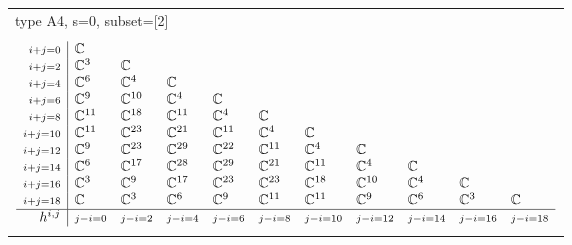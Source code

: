 \documentclass[crop,border=2mm]{standalone}
\begin{document}
\begin{tabular}{l}
{\huge type A4, s=0, subset=[2]}\\ \\


$\displaystyle
\begin{array}{r|l l l l l l l l l l}
	{\scriptstyle i+j=0}&\mathbb{C}&&&&&&&&&\\
	{\scriptstyle i+j=2}&\mathbb{C}^{3}&\mathbb{C}&&&&&&&&\\
	{\scriptstyle i+j=4}&\mathbb{C}^{6}&\mathbb{C}^{4}&\mathbb{C}&&&&&&&\\
	{\scriptstyle i+j=6}&\mathbb{C}^{9}&\mathbb{C}^{10}&\mathbb{C}^{4}&\mathbb{C}&&&&&&\\
	{\scriptstyle i+j=8}&\mathbb{C}^{11}&\mathbb{C}^{18}&\mathbb{C}^{11}&\mathbb{C}^{4}&\mathbb{C}&&&&&\\
	{\scriptstyle i+j=10}&\mathbb{C}^{11}&\mathbb{C}^{23}&\mathbb{C}^{21}&\mathbb{C}^{11}&\mathbb{C}^{4}&\mathbb{C}&&&&\\
	{\scriptstyle i+j=12}&\mathbb{C}^{9}&\mathbb{C}^{23}&\mathbb{C}^{29}&\mathbb{C}^{22}&\mathbb{C}^{11}&\mathbb{C}^{4}&\mathbb{C}&&&\\
	{\scriptstyle i+j=14}&\mathbb{C}^{6}&\mathbb{C}^{17}&\mathbb{C}^{28}&\mathbb{C}^{29}&\mathbb{C}^{21}&\mathbb{C}^{11}&\mathbb{C}^{4}&\mathbb{C}&&\\
	{\scriptstyle i+j=16}&\mathbb{C}^{3}&\mathbb{C}^{9}&\mathbb{C}^{17}&\mathbb{C}^{23}&\mathbb{C}^{23}&\mathbb{C}^{18}&\mathbb{C}^{10}&\mathbb{C}^{4}&\mathbb{C}&\\
	{\scriptstyle i+j=18}&\mathbb{C}&\mathbb{C}^{3}&\mathbb{C}^{6}&\mathbb{C}^{9}&\mathbb{C}^{11}&\mathbb{C}^{11}&\mathbb{C}^{9}&\mathbb{C}^{6}&\mathbb{C}^{3}&\mathbb{C}\\
	\hline h^{i,j}&{\scriptstyle j-i=0}&{\scriptstyle j-i=2}&{\scriptstyle j-i=4}&{\scriptstyle j-i=6}&{\scriptstyle j-i=8}&{\scriptstyle j-i=10}&{\scriptstyle j-i=12}&{\scriptstyle j-i=14}&{\scriptstyle j-i=16}&{\scriptstyle j-i=18}
\end{array}
$ \\ \\



\end{tabular}
\end{document}
